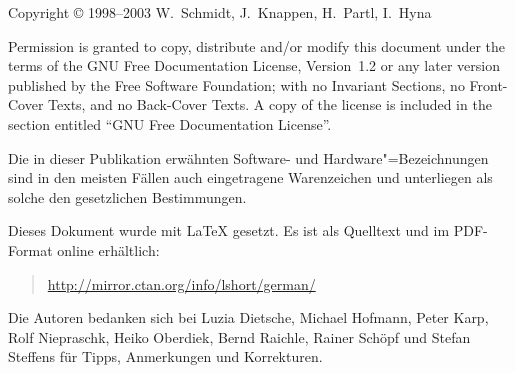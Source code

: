 {\parindent=0cm\thispagestyle{empty}

Copyright \copyright{} 1998--2003 W.~Schmidt, J.~Knappen, H.~Partl, I.~Hyna

\bigskip

{
  Permission is granted to copy, distribute and/or modify this document
  under the terms of the GNU Free Documentation License, Version~1.2
  or any later version published by the Free Software Foundation;
  with no Invariant Sections, no Front-Cover Texts, and no Back-Cover Texts.
  A copy of the license is included in the section entitled ``GNU
  Free Documentation License''.
}

\bigskip

Die in dieser Publikation erwähnten Software- und Hardware"=Bezeichnungen sind
in den meisten Fällen auch eingetragene Warenzeichen und unterliegen als
solche den gesetzlichen Bestimmungen.

\bigskip

\vfill

Dieses Dokument wurde mit \LaTeX{} gesetzt.
Es ist als Quelltext und im PDF-Format online erhältlich:
\begin{quote}
\url{http://mirror.ctan.org/info/lshort/german/}
\end{quote}
\bigskip

Die Autoren bedanken sich bei
Luzia Dietsche, 
Michael Hofmann, 
Peter Karp,
Rolf \mbox{Niepraschk},
Heiko Oberdiek,
Bernd Raichle, 
Rainer Schöpf und
Stefan Steffens
für Tipps, Anmerkungen und  Korrekturen.

}
